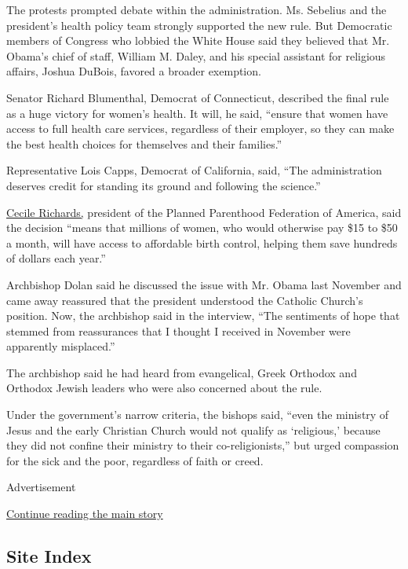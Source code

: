 The protests prompted debate within the administration. Ms. Sebelius and
the president's health policy team strongly supported the new rule. But
Democratic members of Congress who lobbied the White House said they
believed that Mr. Obama's chief of staff, William M. Daley, and his
special assistant for religious affairs, Joshua DuBois, favored a
broader exemption.

Senator Richard Blumenthal, Democrat of Connecticut, described the final
rule as a huge victory for women's health. It will, he said, ``ensure
that women have access to full health care services, regardless of their
employer, so they can make the best health choices for themselves and
their families.''

Representative Lois Capps, Democrat of California, said, ``The
administration deserves credit for standing its ground and following the
science.''

\href{http://www.plannedparenthood.org/about-us/newsroom/press-releases/planned-parenthood-applauds-hhs-ensuring-access-affordable-birth-control-38582.htm}{Cecile
Richards,} president of the Planned Parenthood Federation of America,
said the decision ``means that millions of women, who would otherwise
pay \$15 to \$50 a month, will have access to affordable birth control,
helping them save hundreds of dollars each year.''

Archbishop Dolan said he discussed the issue with Mr. Obama last
November and came away reassured that the president understood the
Catholic Church's position. Now, the archbishop said in the interview,
``The sentiments of hope that stemmed from reassurances that I thought I
received in November were apparently misplaced.''

The archbishop said he had heard from evangelical, Greek Orthodox and
Orthodox Jewish leaders who were also concerned about the rule.

Under the government's narrow criteria, the bishops said, ``even the
ministry of Jesus and the early Christian Church would not qualify as
`religious,' because they did not confine their ministry to their
co-religionists,'' but urged compassion for the sick and the poor,
regardless of faith or creed.

Advertisement

\protect\hyperlink{after-bottom}{Continue reading the main story}

\hypertarget{site-index}{%
\subsection{Site Index}\label{site-index}}

